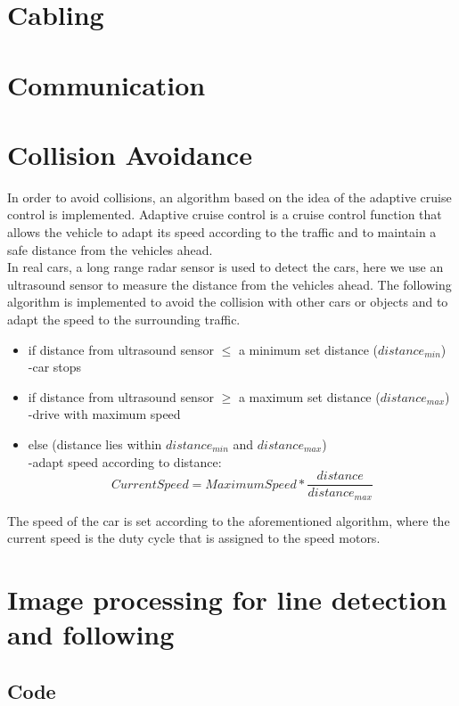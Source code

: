 \documentclass[11pt,twocolumn]{article}
\begin{document}
\section{Cabling}

\section{Communication}

\section{Collision Avoidance}
In order to avoid collisions, an algorithm based on the idea of the adaptive cruise control is implemented. Adaptive cruise control is a cruise control function that allows the vehicle to adapt its speed according to the traffic and to maintain a safe distance from the vehicles ahead.\\
In real cars, a long range radar sensor is used to detect the cars, here we use an ultrasound sensor to measure the distance from the vehicles ahead. The following algorithm is implemented to avoid the collision with other cars or objects and to adapt the speed to the surrounding traffic.
\begin{itemize}
	\item if distance from ultrasound sensor $\leq$ a minimum set distance ($distance_{min}$)\\
	-car stops
	\item if distance from ultrasound sensor $\geq$ a maximum set distance ($distance_{max}$)\\
	 -drive with maximum speed
	\item else (distance lies within $distance_{min}$ and $distance_{max}$)\\
	 -adapt speed according to distance:
	 \begin{equation}
	 Current Speed = Maximum Speed * \frac{distance}{distance_{max}}
	 \end{equation}
\end{itemize}

The speed of the car is set according to the aforementioned algorithm, where the current speed is the duty cycle that is assigned to the speed motors.
\section{Image processing for line detection and following}
\subsection{Code}
\end{document}
